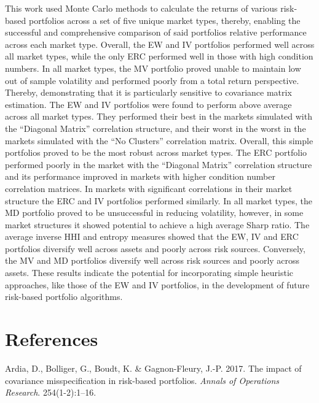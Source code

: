 \documentclass[11pt,preprint, authoryear]{elsarticle}
\numberwithin{equation}{section}
\numberwithin{figure}{section}
\numberwithin{table}{section}
\begin{document}
This work used Monte Carlo methods to calculate the returns of various
risk-based portfolios across a set of five unique market types, thereby,
enabling the successful and comprehensive comparison of said portfolios
relative performance across each market type. Overall, the EW and IV
portfolios performed well across all market types, while the only ERC
performed well in those with high condition numbers. In all market
types, the MV portfolio proved unable to maintain low out of sample
volatility and performed poorly from a total return perspective.
Thereby, demonstrating that it is particularly sensitive to covariance
matrix estimation. The EW and IV portfolios were found to perform above
average across all market types. They performed their best in the
markets simulated with the ``Diagonal Matrix'' correlation structure,
and their worst in the worst in the markets simulated with the ``No
Clusters'' correlation matrix. Overall, this simple portfolios proved to
be the most robust across market types. The ERC portfolio performed
poorly in the market with the ``Diagonal Matrix'' correlation structure
and its performance improved in markets with higher condition number
correlation matrices. In markets with significant correlations in their
market structure the ERC and IV portfolios performed similarly. In all
market types, the MD portfolio proved to be unsuccessful in reducing
volatility, however, in some market structures it showed potential to
achieve a high average Sharp ratio. The average inverse HHI and entropy
measures showed that the EW, IV and ERC portfolios diversify well across
assets and poorly across risk sources. Conversely, the MV and MD
portfolios diversify well across risk sources and poorly across assets.
These results indicate the potential for incorporating simple heuristic
approaches, like those of the EW and IV portfolios, in the development
of future risk-based portfolio algorithms.

\newpage

\hypertarget{references}{%
\section*{References}\label{references}}

\hypertarget{refs}{}
\leavevmode\hypertarget{ref-ardia2017}{}%
Ardia, D., Bolliger, G., Boudt, K. \& Gagnon-Fleury, J.-P. 2017. The
impact of covariance misspecification in risk-based portfolios.
\emph{Annals of Operations Research}. 254(1-2):1--16.
\end{document}
